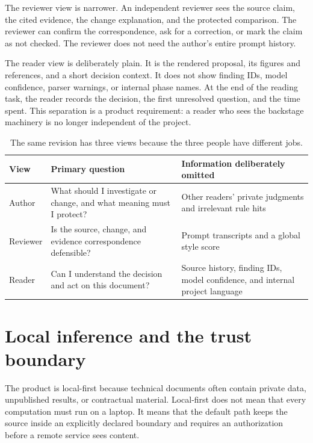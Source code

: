 The reviewer view is narrower. An independent reviewer sees the source claim,
the cited evidence, the change explanation, and the protected comparison. The
reviewer can confirm the correspondence, ask for a correction, or mark the
claim as not checked. The reviewer does not need the author's entire prompt
history.

The reader view is deliberately plain. It is the rendered proposal, its
figures and references, and a short decision context. It does not show finding
IDs, model confidence, parser warnings, or internal phase names. At the end of
the reading task, the reader records the decision, the first unresolved
question, and the time spent. This separation is a product requirement: a
reader who sees the backstage machinery is no longer independent of the project.

\begin{table}[H]
\centering
\small
\begin{tabularx}{\textwidth}{@{}p{}p{}L@{}}
\toprule
View & Primary question & Information deliberately omitted \\
\midrule
Author & What should I investigate or change, and what meaning must I protect? &
Other readers' private judgments and irrelevant rule hits \\
Reviewer & Is the source, change, and evidence correspondence defensible? &
Prompt transcripts and a global style score \\
Reader & Can I understand the decision and act on this document? & Source
history, finding IDs, model confidence, and internal project language \\
\bottomrule
\end{tabularx}
\caption{The same revision has three views because the three people have
different jobs.}
\label{tab:architecture-views}
\end{table}

\section{Local inference and the trust boundary}
\label{sec:architecture-trust}

The product is local-first because technical documents often contain private
data, unpublished results, or contractual material. Local-first does not mean
that every computation must run on a laptop. It means that the default path
keeps the source inside an explicitly declared boundary and requires an
authorization before a remote service sees content.

